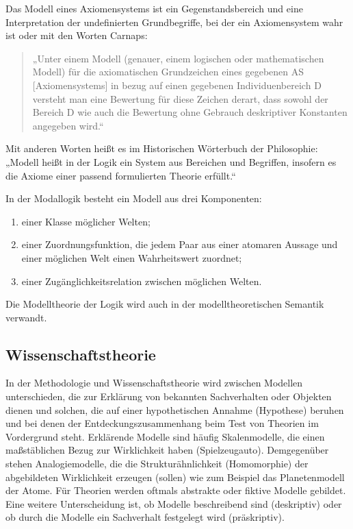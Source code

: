 \documentclass[a4paper, 12pt, pagesize]{scrartcl}
\begin{document}
Das Modell eines Axiomensystems ist ein Gegenstandsbereich und eine Interpretation der undefinierten Grundbegriffe, bei der ein Axiomensystem wahr ist oder mit den Worten Carnaps:

\begin{quote}
    „Unter einem Modell (genauer, einem logischen oder mathematischen Modell) für die axiomatischen Grundzeichen eines gegebenen AS [Axiomensystems] in bezug auf einen gegebenen Individuenbereich D versteht man eine Bewertung für diese Zeichen derart, dass sowohl der Bereich D wie auch die Bewertung ohne Gebrauch deskriptiver Konstanten angegeben wird.“
\end{quote}

Mit anderen Worten heißt es im Historischen Wörterbuch der Philosophie: „Modell heißt in der Logik ein System aus Bereichen und Begriffen, insofern es die Axiome einer passend formulierten Theorie erfüllt.“

In der Modallogik besteht ein Modell aus drei Komponenten:

\begin{enumerate}
    \item einer Klasse möglicher Welten;
    \item einer Zuordnungsfunktion, die jedem Paar aus einer atomaren Aussage und einer möglichen Welt einen Wahrheitswert zuordnet;
    \item einer Zugänglichkeitsrelation zwischen möglichen Welten.
\end{enumerate}

Die Modelltheorie der Logik wird auch in der modelltheoretischen Semantik verwandt.

\subsection{Wissenschaftstheorie}
In der Methodologie und Wissenschaftstheorie wird zwischen Modellen unterschieden, die zur Erklärung von bekannten Sachverhalten oder Objekten dienen und solchen, die auf einer hypothetischen Annahme (Hypothese) beruhen und bei denen der Entdeckungszusammenhang beim Test von Theorien im Vordergrund steht. Erklärende Modelle sind häufig Skalenmodelle, die einen maßstäblichen Bezug zur Wirklichkeit haben (Spielzeugauto). Demgegenüber stehen Analogiemodelle, die die Strukturähnlichkeit (Homomorphie) der abgebildeten Wirklichkeit erzeugen (sollen) wie zum Beispiel das Planetenmodell der Atome. Für Theorien werden oftmals abstrakte oder fiktive Modelle gebildet. Eine weitere Unterscheidung ist, ob Modelle beschreibend sind (deskriptiv) oder ob durch die Modelle ein Sachverhalt festgelegt wird (präskriptiv).
\end{document}
